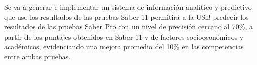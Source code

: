 Se va a generar e implementar un sistema de información analítico y predictivo que use los resultados de las pruebas Saber 11 permitirá a la USB predecir los resultados de las pruebas Saber Pro con un nivel de precisión cercano al 70\%, a partir de los puntajes obtenidos en Saber 11 y de factores socioeconómicos y académicos, evidenciando una mejora promedio del 10\% en las competencias entre ambas pruebas.